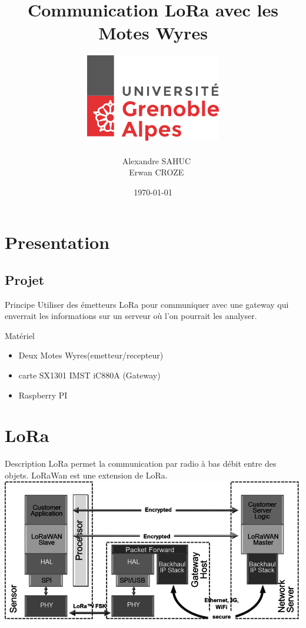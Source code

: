 \documentclass{beamer}
\title{Communication LoRa avec les Motes Wyres}
\author{\includegraphics[scale=0.3]{univ.png} \\~ \\ ~ Alexandre SAHUC\\~ Erwan CROZE}
\institute{Université Joseph Fourier \newline M2M}
\date{\today}
\begin{document}
\begin{frame}
	\titlepage
\end{frame}

\section{Presentation}
\subsection{Projet}
\begin{frame}
  	\begin{block}{Principe}
  		Utiliser des émetteurs LoRa pour communiquer avec une gateway qui enverrait les informations sur un serveur où l'on pourrait les analyser.
	\end{block}
	
	\begin{exampleblock}{Matériel}
		\begin{itemize}
			\item Deux Motes Wyres(emetteur/recepteur)
			\item carte SX1301 IMST iC880A (Gateway)
			\item Raspberry PI 
		\end{itemize}
	\end{exampleblock}
\end{frame}

\section{LoRa}
\begin{frame}
	\begin{block}{Description}
		LoRa permet la communication par radio à bas débit entre des objets.
		LoRaWan est une extension de LoRa.
		\center
		\includegraphics[scale=0.5]{LoRa-network.png}
	\end{block}
\end{frame}
\end{document}
